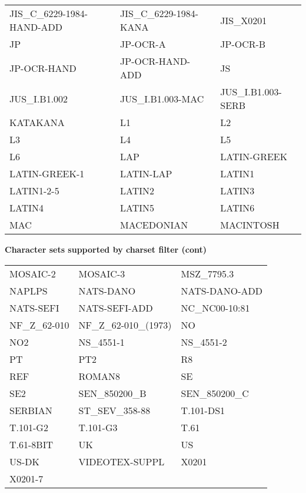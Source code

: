 \begin {tabular} {l l l}
JIS\_C\_6229-1984-HAND-ADD & JIS\_C\_6229-1984-KANA & JIS\_X0201 \\
JP & JP-OCR-A & JP-OCR-B \\
JP-OCR-HAND & JP-OCR-HAND-ADD & JS \\
JUS\_I.B1.002 & JUS\_I.B1.003-MAC & JUS\_I.B1.003-SERB \\
KATAKANA & L1 & L2 \\
L3 & L4 & L5 \\
L6 & LAP & LATIN-GREEK \\
LATIN-GREEK-1 & LATIN-LAP & LATIN1 \\
LATIN1-2-5 & LATIN2 & LATIN3 \\
LATIN4 & LATIN5 & LATIN6 \\
MAC & MACEDONIAN & MACINTOSH \\
\end {tabular}

\clearpage
{\bf Character sets supported by charset filter (cont)}
\bigskip\bigskip\noindent


\begin {tabular} {l l l}
MOSAIC-2 & MOSAIC-3 & MSZ\_7795.3 \\
NAPLPS & NATS-DANO & NATS-DANO-ADD \\
NATS-SEFI & NATS-SEFI-ADD & NC\_NC00-10:81 \\
NF\_Z\_62-010 & NF\_Z\_62-010\_(1973) & NO \\
NO2 & NS\_4551-1 & NS\_4551-2 \\
PT & PT2 & R8 \\
REF & ROMAN8 & SE \\
SE2 & SEN\_850200\_B & SEN\_850200\_C \\
SERBIAN & ST\_SEV\_358-88 & T.101-DS1 \\
T.101-G2 & T.101-G3 & T.61 \\
T.61-8BIT & UK & US \\
US-DK & VIDEOTEX-SUPPL & X0201 \\
X0201-7 & & \\
\end {tabular}

